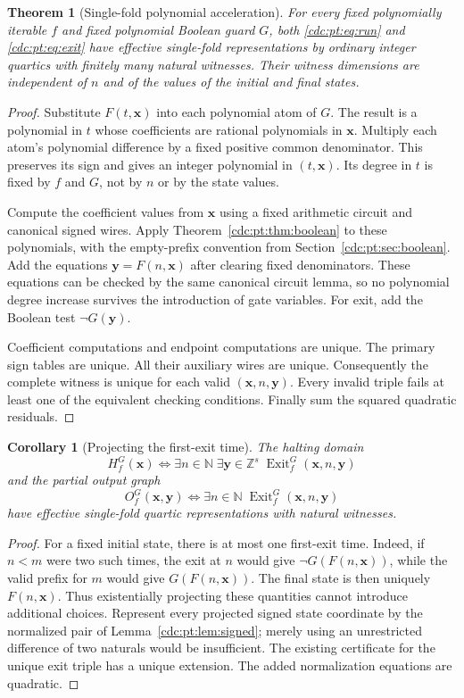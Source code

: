 \documentclass[11pt,a4paper]{article}
\newtheorem{theorem}{Theorem}[section]
\newtheorem{corollary}[corollary]{Corollary}
\theoremstyle{definition}
\theoremstyle{remark}
\newcommand{\N}{\mathbb N}
\newcommand{\Z}{\mathbb Z}
\newcommand{\Exit}{\operatorname{Exit}}
\begin{document}
\begin{theorem}[Single-fold polynomial acceleration]
\label{cdc:pt:thm:acceleration}
For every fixed polynomially iterable $f$ and fixed polynomial Boolean
guard $G$, both \eqref{cdc:pt:eq:run} and \eqref{cdc:pt:eq:exit} have effective
single-fold representations by ordinary integer quartics with finitely
many natural witnesses. Their witness dimensions are independent of $n$
and of the values of the initial and final states.
\end{theorem}
\begin{proof}
Substitute $F(t,\boldsymbol x)$ into each polynomial atom of $G$.
The result is a polynomial in $t$ whose coefficients are rational
polynomials in $\boldsymbol x$. Multiply each atom's polynomial difference
by a fixed positive common denominator. This preserves its sign and gives
an integer polynomial in $(t,\boldsymbol x)$. Its degree in $t$ is fixed
by $f$ and $G$, not by $n$ or by the state values.

Compute the coefficient values from $\boldsymbol x$ using a fixed
arithmetic circuit and canonical signed wires. Apply
Theorem~\ref{cdc:pt:thm:boolean} to these polynomials, with the empty-prefix
convention from Section~\ref{cdc:pt:sec:boolean}. Add the equations
$\boldsymbol y=F(n,\boldsymbol x)$ after clearing fixed denominators.
These equations can be checked by the same canonical circuit lemma, so
no polynomial degree increase survives the introduction of gate variables.
For exit, add the Boolean test $\neg G(\boldsymbol y)$.

Coefficient computations and endpoint computations are unique. The primary
sign tables are unique. All their auxiliary wires are unique.
Consequently the complete witness is unique for each valid
$(\boldsymbol x,n,\boldsymbol y)$. Every invalid triple fails at least one
of the equivalent checking conditions. Finally sum the squared quadratic
residuals.
\end{proof}

\begin{corollary}[Projecting the first-exit time]
\label{cdc:pt:cor:first-exit}
The halting domain
\[
 H_f^G(\boldsymbol x)\iff
 \exists n\in\N\;\exists\boldsymbol y\in\Z^s\;
 \Exit_f^G(\boldsymbol x,n,\boldsymbol y)
\]
and the partial output graph
\[
 O_f^G(\boldsymbol x,\boldsymbol y)\iff
 \exists n\in\N\;\Exit_f^G(\boldsymbol x,n,\boldsymbol y)
\]
have effective single-fold quartic representations with natural witnesses.
\end{corollary}
\begin{proof}
For a fixed initial state, there is at most one first-exit time. Indeed, if
$n<m$ were two such times, the exit at $n$ would give
$\neg G(F(n,\boldsymbol x))$, while the valid prefix for $m$ would give
$G(F(n,\boldsymbol x))$. The final state is then uniquely
$F(n,\boldsymbol x)$. Thus existentially projecting these quantities
cannot introduce additional choices. Represent every projected signed
state coordinate by the normalized pair of Lemma~\ref{cdc:pt:lem:signed}; merely
using an unrestricted difference of two naturals would be insufficient.
The existing certificate for the unique exit triple has a unique extension.
The added normalization equations are quadratic.
\end{proof}
\end{document}
